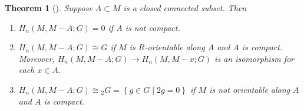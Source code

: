 \documentclass[reqno]{amsart}
\newtheorem{theorem}{Theorem}[section]
\theoremstyle{definition}
\theoremstyle{remark}
\begin{document}
\begin{theorem}[]\label{Thm:UDWOQJNX}
    Suppose $A \subset M$ is a closed connected subset.
    Then
    \begin{enumerate}
        \item $H_n(M,M-A; G) = 0$ if $A$ is not compact.
        \item $H_n(M, M-A;G) \cong G$ if 
            $M$ is $R$-orientable along $A$ and $A$ is 
            compact. Moreover, $H_n(M,M-A;G) \to 
            H_n(M,M- x ; G)$ is an isomorphism
            for each $x \in A$.
        \item $H_n(M, M-A; G) \cong 
            {}_{2}G = 
            \left\{ g \in G  \mid 2 g = 0 \right\} $ if
            $M$ is not orientable along $A$ and $A$ is compact.
    \end{enumerate}
\end{theorem}
\end{document}
